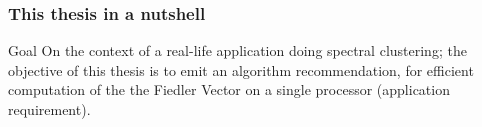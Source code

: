 \begin{frame}
  \frametitle{This thesis in a nutshell}
  \begin{block}{Goal}
    On the context of a real-life application doing spectral
    clustering; the objective of this thesis is to emit an algorithm
    recommendation, for efficient 
    computation of the the Fiedler Vector on a single processor
    (application requirement). 
  \end{block}
\end{frame}
